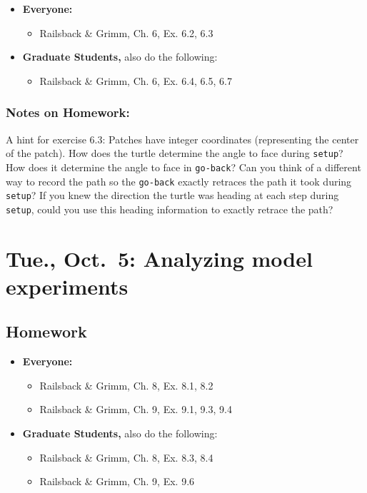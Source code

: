 \documentclass[
]{article}
\providecommand{\tightlist}{%
  \setlength{\itemsep}{0pt}\setlength{\parskip}{0pt}}
\begin{document}
\begin{itemize}
\tightlist
\item
  \textbf{Everyone:}

  \begin{itemize}
  \tightlist
  \item
    Railsback \& Grimm, Ch. 6, Ex. 6.2, 6.3
  \end{itemize}
\item
  \textbf{Graduate Students,} also do the following:

  \begin{itemize}
  \tightlist
  \item
    Railsback \& Grimm, Ch. 6, Ex. 6.4, 6.5, 6.7
  \end{itemize}
\end{itemize}

\hypertarget{notes-on-homework-5}{%
\subsubsection{Notes on Homework:}\label{notes-on-homework-5}}

A hint for exercise 6.3: Patches have integer coordinates (representing
the center of the patch). How does the turtle determine the angle to
face during \texttt{setup}? How does it determine the angle to face in
\texttt{go-back}? Can you think of a different way to record the path so
the \texttt{go-back} exactly retraces the path it took during
\texttt{setup}? If you knew the direction the turtle was heading at each
step during \texttt{setup}, could you use this heading information to
exactly retrace the path?

\hypertarget{tue.-oct.-5-analyzing-model-experiments}{%
\section{Tue., Oct.~5: Analyzing model
experiments}\label{tue.-oct.-5-analyzing-model-experiments}}

\hypertarget{homework-8}{%
\subsection{Homework}\label{homework-8}}

\begin{itemize}
\tightlist
\item
  \textbf{Everyone:}

  \begin{itemize}
  \tightlist
  \item
    Railsback \& Grimm, Ch. 8, Ex. 8.1, 8.2
  \item
    Railsback \& Grimm, Ch. 9, Ex. 9.1, 9.3, 9.4
  \end{itemize}
\item
  \textbf{Graduate Students,} also do the following:

  \begin{itemize}
  \tightlist
  \item
    Railsback \& Grimm, Ch. 8, Ex. 8.3, 8.4
  \item
    Railsback \& Grimm, Ch. 9, Ex. 9.6
  \end{itemize}
\end{itemize}
\end{document}
